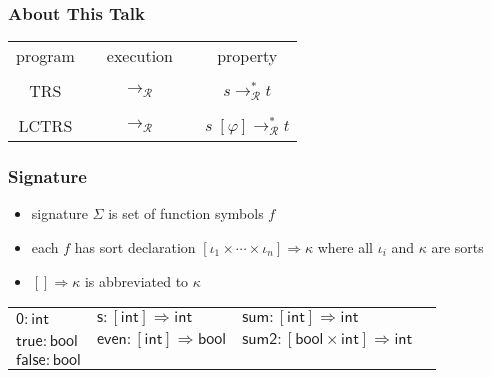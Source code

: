 \documentclass[12pt,aspectratio=169]{beamer}
\newcommand{\m}[1]{\mathsf{#1}}
\newcommand{\RR}{\mathcal{R}}
\begin{document}
\begin{frame}
    \frametitle{About This Talk}
    
    {\LARGE
    \begin{table}
        \centering
        \begin{tabular}{ccccc}
            program & & \pause execution & & \pause property \\\\ \pause
            TRS     & & $\to_\RR$ & & $s \to_\RR^* t$ \\\\ \pause
            LCTRS   & & \alert{$\to_\RR$} & & $s \; [\varphi] \to_\RR^* t$
        \end{tabular}
    \end{table}
    }
\end{frame}

\begin{frame}
    \frametitle{Signature}
    \begin{definition}[signature]
        \begin{itemize}
        \item \alert{signature} $\Sigma$ is set of function symbols $f$
            \pause
        \item each $f$ has \alert{sort declaration}
            \pause
        $[\iota_1 \times \cdots \times \iota_n] \Rightarrow \kappa$
        where all $\iota_i$ and $\kappa$ are sorts
            \pause
        \item $[] \Rightarrow \kappa$ is abbreviated to $\kappa$
    \end{itemize}
    \end{definition}
    \pause
    \begin{example}
    \begin{tabular}{llll}
        $\m{0} : \m{int}$ & $\m{s} : [\m{int}] \Rightarrow \m{int}$ & $\m{sum} : [\m{int}] \Rightarrow \m{int}$ \\
        $\m{true} : \m{bool}$ & $\m{even} : [\m{int}] \Rightarrow \m{bool}$ & $\m{sum2} : [\m{bool} \times \m{int}] \Rightarrow \m{int}$\\
        $\m{false} : \m{bool}$ & &
    \end{tabular}
    \end{example}
\end{frame}
\end{document}
